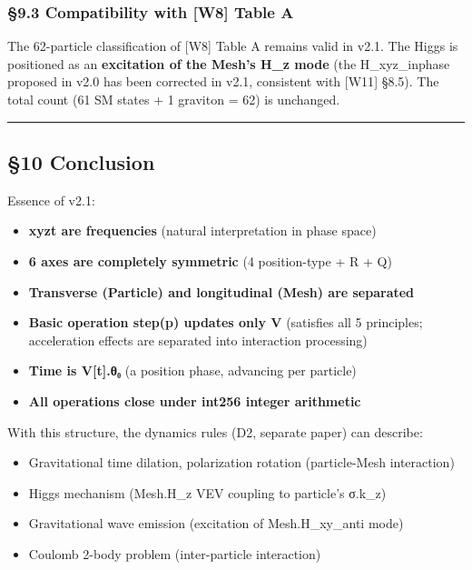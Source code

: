 \documentclass[a4paper,11pt]{article}
\providecommand{\tightlist}{\setlength{\itemsep}{0pt}\setlength{\parskip}{0pt}}
\begin{document}
\subsubsection{§9.3 Compatibility with {[}W8{]} Table
A}\label{compatibility-with-w8-table-a}

The 62-particle classification of {[}W8{]} Table A remains valid in
v2.1. The Higgs is positioned as an \textbf{excitation of the Mesh's
H\_z mode} (the H\_xyz\_inphase proposed in v2.0 has been corrected in
v2.1, consistent with {[}W11{]} §8.5). The total count (61 SM states + 1
graviton = 62) is unchanged.

\begin{center}\rule{0.5\linewidth}{0.5pt}\end{center}

\subsection{§10 Conclusion}\label{conclusion}

Essence of v2.1:

\begin{itemize}
\tightlist
\item
  \textbf{xyzt are frequencies} (natural interpretation in phase space)
\item
  \textbf{6 axes are completely symmetric} (4 position-type + R + Q)
\item
  \textbf{Transverse (Particle) and longitudinal (Mesh) are separated}
\item
  \textbf{Basic operation step(p) updates only V} (satisfies all 5
  principles; acceleration effects are separated into interaction
  processing)
\item
  \textbf{Time is V{[}t{]}.θ₀} (a position phase, advancing per
  particle)
\item
  \textbf{All operations close under int256 integer arithmetic}
\end{itemize}

With this structure, the dynamics rules (D2, separate paper) can
describe:

\begin{itemize}
\tightlist
\item
  Gravitational time dilation, polarization rotation (particle-Mesh
  interaction)
\item
  Higgs mechanism (Mesh.H\_z VEV coupling to particle's σ.k\_z)
\item
  Gravitational wave emission (excitation of Mesh.H\_xy\_anti mode)
\item
  Coulomb 2-body problem (inter-particle interaction)
\end{itemize}
\end{document}
